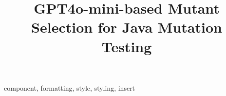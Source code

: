 \documentclass[conference]{IEEEtran}
\begin{document}
\title{GPT4o-mini-based Mutant Selection for Java Mutation Testing}


\author{
}

\maketitle

\begin{abstract}

\end{abstract}

\begin{IEEEkeywords}
component, formatting, style, styling, insert
\end{IEEEkeywords}











\end{document}
